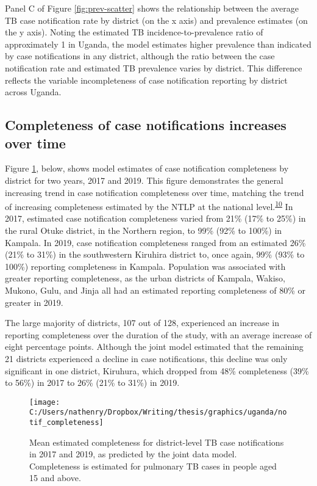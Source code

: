 \documentclass[
]{article}
\begin{document}
Panel C of Figure \ref{fig:prev-scatter} shows the relationship between the average TB case notification rate by district (on the x axis) and prevalence estimates (on the y axis). Noting the estimated TB incidence-to-prevalence ratio of approximately 1 in Uganda, the model estimates higher prevalence than indicated by case notifications in any district, although the ratio between the case notification rate and estimated TB prevalence varies by district. This difference reflects the variable incompleteness of case notification reporting by district across Uganda.

\hypertarget{completeness-of-case-notifications-increases-over-time}{%
\subsection{Completeness of case notifications increases over time}\label{completeness-of-case-notifications-increases-over-time}}

Figure \ref{fig:notif-completeness}, below, shows model estimates of case notification completeness by district for two years, 2017 and 2019. This figure demonstrates the general increasing trend in case notification completeness over time, matching the trend of increasing completeness estimated by the NTLP at the national level.\textsuperscript{\protect\hyperlink{ref-UgandaNationalTuberculosisandLeprosyProgramme2020}{10}} In 2017, estimated case notification completeness varied from 21\% (17\% to 25\%) in the rural Otuke district, in the Northern region, to 99\% (92\% to 100\%) in Kampala. In 2019, case notification completeness ranged from an estimated 26\% (21\% to 31\%) in the southwestern Kiruhira district to, once again, 99\% (93\% to 100\%) reporting completeness in Kampala. Population was associated with greater reporting completeness, as the urban districts of Kampala, Wakiso, Mukono, Gulu, and Jinja all had an estimated reporting completeness of 80\% or greater in 2019.

The large majority of districts, 107 out of 128, experienced an increase in reporting completeness over the duration of the study, with an average increase of eight percentage points. Although the joint model estimated that the remaining 21 districts experienced a decline in case notifications, this decline was only significant in one district, Kiruhura, which dropped from 48\% completeness (39\% to 56\%) in 2017 to 26\% (21\% to 31\%) in 2019.

\begin{figure}[!ht]

{\centering \texttt{[image: C:/Users/nathenry/Dropbox/Writing/thesis/graphics/uganda/notif\_completeness]} 

}

\caption{Mean estimated completeness for district-level TB case notifications in 2017 and 2019, as predicted by the joint data model. Completeness is estimated for pulmonary TB cases in people aged 15 and above.}\label{fig:notif-completeness}
\end{figure}
\end{document}

